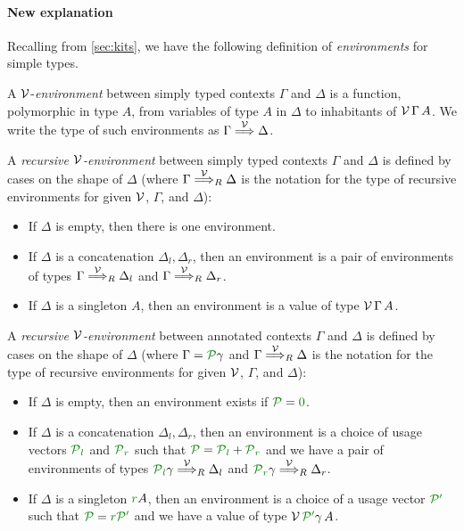 \paragraph{New explanation}
Recalling from \cref{sec:kits}, we have the following definition of
\emph{environments} for simple types.

\begin{definition}
  A $\mathcal V$-\emph{environment} between simply typed contexts $\Gamma$ and $\Delta$
  is a function, polymorphic in type $A$, from variables of type $A$ in
  $\Delta$ to inhabitants of $\mathcal V\,\Gamma\,A$.
  We write the type of such environments as $\Gamma \stackrel{\mathcal V}\Longrightarrow \Delta$.
\end{definition}

\begin{definition}
  A \emph{recursive $\mathcal V$-environment} between simply typed contexts $\Gamma$ and
  $\Delta$ is defined by cases on the shape of $\Delta$ (where
  $\Gamma \stackrel{\mathcal V}\Longrightarrow_R \Delta$ is the notation for the type of recursive
  environments for given $\mathcal V$, $\Gamma$, and $\Delta$):
  \begin{itemize}
    \item If $\Delta$ is empty, then there is one environment.
    \item If $\Delta$ is a concatenation $\Delta_l, \Delta_r$, then an
      environment is a pair of environments of types
      $\Gamma \stackrel{\mathcal V}\Longrightarrow_R \Delta_l$ and $\Gamma \stackrel{\mathcal V}\Longrightarrow_R \Delta_r$.
    \item If $\Delta$ is a singleton $A$, then an environment is a value of
      type $\mathcal V\,\Gamma\,A$.
  \end{itemize}
\end{definition}

\begin{definition}
  A \emph{recursive $\mathcal V$-environment} between annotated contexts $\Gamma$ and
  $\Delta$ is defined by cases on the shape of $\Delta$ (where
  $\Gamma = \grP\gamma$ and $\Gamma \stackrel{\mathcal V}\Longrightarrow_R \Delta$ is the notation for the
  type of recursive environments for given $\mathcal V$, $\Gamma$, and $\Delta$):
  \begin{itemize}
    \item If $\Delta$ is empty, then an environment exists if $\grP = \gr0$.
    \item If $\Delta$ is a concatenation $\Delta_l, \Delta_r$, then an
      environment is a choice of usage vectors $\grPl$ and $\grPr$ such that
      $\grP = \grPl + \grPr$ and we have a pair of environments of types
      $\grPl\gamma \env\V_R \Delta_l$ and $\grPr\gamma \env\V_R \Delta_r$.
    \item If $\Delta$ is a singleton $\gr rA$, then an environment is a choice
      of a usage vector $\grPprime$ such that $\grP = \gr r\grPprime$ and we
      have a value of type $\V\,\grPprime\gamma\,A$.
  \end{itemize}
\end{definition}

